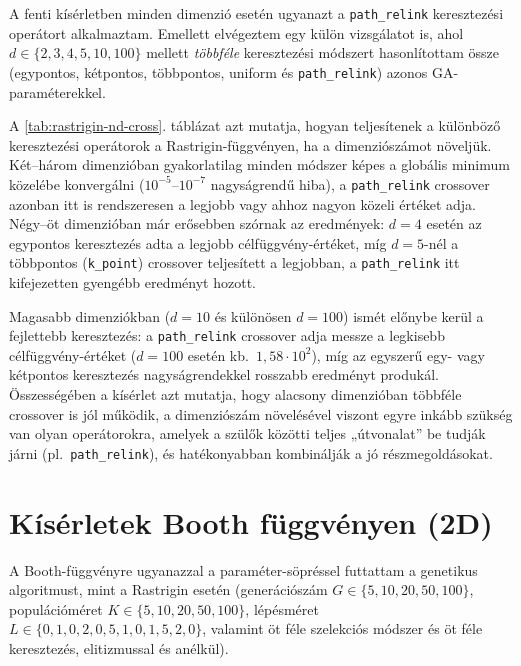 \documentclass[a4paper,12pt]{article}
\begin{document}
A fenti kísérletben minden dimenzió esetén ugyanazt a
\texttt{path\_relink} keresztezési operátort alkalmaztam.
Emellett elvégeztem egy külön vizsgálatot is, ahol
$d \in \{2,3,4,5,10,100\}$ mellett \emph{többféle}
keresztezési módszert hasonlítottam össze
(egypontos, kétpontos, többpontos, uniform és \texttt{path\_relink})
azonos GA-paraméterekkel.

\begin{table}[H]
  \centering
  \small
  
  \caption{Különböző keresztezési módszerek hatása különböző dimenziószámok mellett a Rastrigin-függvényen.}
  \label{tab:rastrigin-nd-cross}
\end{table}

A \ref{tab:rastrigin-nd-cross}. táblázat azt mutatja, hogyan teljesítenek
a különböző keresztezési operátorok a Rastrigin-függvényen, ha a
dimenziószámot növeljük. Két–három dimenzióban gyakorlatilag minden
módszer képes a globális minimum közelébe konvergálni
($10^{-5}$--$10^{-7}$ nagyságrendű hiba), a \texttt{path\_relink}
crossover azonban itt is rendszeresen a legjobb vagy ahhoz nagyon
közeli értéket adja. Négy–öt dimenzióban már erősebben szórnak az
eredmények: $d=4$ esetén az egypontos keresztezés adta a legjobb
célfüggvény-értéket, míg $d=5$-nél a többpontos (\texttt{k\_point})
crossover teljesített a legjobban, a \texttt{path\_relink} itt
kifejezetten gyengébb eredményt hozott.

Magasabb dimenziókban ($d=10$ és különösen $d=100$) ismét előnybe kerül
a fejlettebb keresztezés: a \texttt{path\_relink} crossover adja messze
a legkisebb célfüggvény-értéket ($d=100$ esetén kb.\ $1{,}58\cdot 10^{2}$),
míg az egyszerű egy- vagy kétpontos keresztezés nagyságrendekkel
rosszabb eredményt produkál. Összességében a kísérlet azt mutatja, hogy
alacsony dimenzióban többféle crossover is jól működik, a dimenziószám
növelésével viszont egyre inkább szükség van olyan operátorokra, amelyek
a szülők közötti teljes „útvonalat” be tudják járni (pl.\ \texttt{path\_relink}),
és hatékonyabban kombinálják a jó részmegoldásokat.

\section{Kísérletek Booth függvényen (2D)}

A Booth-függvényre ugyanazzal a paraméter-söpréssel futtattam a
genetikus algoritmust, mint a Rastrigin esetén
(generációszám $G \in \{5,10,20,50,100\}$,
populációméret $K \in \{5,10,20,50,100\}$,
lépésméret $L \in \{0{,}1,0{,}2,0{,}5,1{,}0,1{,}5,2{,}0\}$,
valamint öt féle szelekciós módszer és öt féle keresztezés, elitizmussal
és anélkül).
\end{document}
